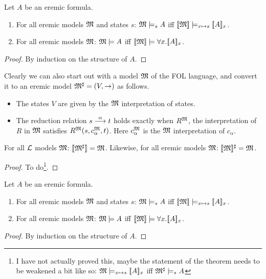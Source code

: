 \begin{theorem}\label{correspondence:theorem}
Let $A$ be an eremic formula.
\begin{enumerate}

\item For all eremic models $\frak{M}$ and states $s$: $\frak{M} \models_s A$
  iff $\lbrack\!\lbrack \frak{M} \rbrack\!\rbrack \models_{x \mapsto s} \lbrack\!\lbrack A \rbrack\!\rbrack_x$.

\item For all eremic models $\frak{M}$: $\frak{M} \models A$ iff $\lbrack\!\lbrack \frak{M} \rbrack\!\rbrack
  \models \forall x.\lbrack\!\lbrack A \rbrack\!\rbrack_x$.

\end{enumerate}
\end{theorem}
\begin{proof}
By induction on the structure of $A$.
\end{proof}


Clearly we can also start out with a model $\frak{M}$ of the FOL language,
and convert it to an eremic model $\frak{M}^{\sharp} = (V, \rightarrow)$ as
follows.

\begin{itemize}

\item The states $V$ are given by the $\frak{M}$ interpretation of states.

\item The reduction relation $s \stackrel{\alpha}{\longrightarrow} t$ holds exactly when
  $R^{\frak{M}}$, the interpretation of $R$ in $\frak{M}$ satisfies
  $R^{\frak{M}}(s, c^{\frak{M}}_{\alpha}, t)$. Here $c^{\frak{M}}_{\alpha}$ is the
  $\frak{M}$ interpretation of $c_{\alpha}$.

\end{itemize}

\begin{lemma}\label{modelIso:lemma}
For all $\mathcal{L}$ models $\frak{M}$: $\lbrack\!\lbrack \frak{M}^{\sharp} \rbrack\!\rbrack = \frak{M}$.
Likewise, for all eremic models $\frak{M}$: 
 $\lbrack\!\lbrack \frak{M} \rbrack\!\rbrack^{\sharp} = \frak{M}$.
\end{lemma}
\begin{proof}
To do\footnote{I have not actually proved this, maybe the statement of
  the theorem needs to be weakened a bit like so: $\frak{M} \models_{x
    \mapsto s} \lbrack\!\lbrack A \rbrack\!\rbrack_x$ iff $\frak{M}^{\sharp} \models_s A$}.
\end{proof}

\begin{theorem}
Let $A$ be an eremic formula.
\begin{enumerate}

\item For all eremic models $\frak{M}$ and states $s$: $\frak{M} \models_s A$
  iff $\lbrack\!\lbrack \frak{M} \rbrack\!\rbrack \models_{x \mapsto s} \lbrack\!\lbrack A \rbrack\!\rbrack_x$.

\item For all eremic models $\frak{M}$: $\frak{M} \models A$ iff $\lbrack\!\lbrack \frak{M} \rbrack\!\rbrack
  \models \forall x.\lbrack\!\lbrack A \rbrack\!\rbrack_x$.

\end{enumerate}
\end{theorem}
\begin{proof}
By induction on the structure of $A$.
\end{proof}



